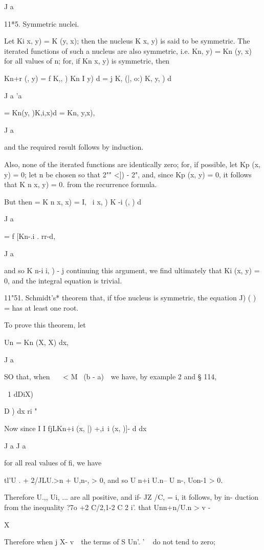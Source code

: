 {J a

%
%

11*5. Symmetric nuclei.

Let Ki x, y) = K (y, x); then the nucleus K x, y) is said to be
symmetric. The iterated functions of such a nucleus are also
symmetric, i.e. Kn, y) = Kn (y, x) for all values of n; for, if Kn
x, y) is symmetric, then

Kn+r (, y) = f K,, ) Kn I y) d = j K, (|, o:) K, y, ) d

J a 'a

= Kn(y, )K,i,x)d = Kn, y,x),

J a

and the required result follows by induction.

Also, none of the iterated functions are identically zero; for, if
possible, let Kp (x, y) = 0; let n be chosen so that 2"" <]) - 2",
and, since Kp (x, y) = 0, it follows that K n x, y) = 0. from the
recurrence formula.

But then = K n x, x) = I, \ i x, ) K -i (, ) d

J a

= f [Kn-.i . rr-d,

J a

and so K n-i i, ) - j continuing this argument, we find ultimately
that Ki (x, y) = 0, and the integral equation is trivial.

11"51. Schmidt's* theorem that, if tfoe nucleus is symmetric, the
equation J) ( ) = has at least one root.

To prove this theorem, let

Un = Kn (X, X) dx,

J a

SO that, when \ \ \ < M~ (b - a)~\ we have, by example 2 and §
114,

\ 1 dDiX)

D ) dx ri " 

Now since I I fjLKn+i (x, |) +,i\ i (x, )]- d dx

J a J a

for all real values of fi, we have

tl'U . + 2/JLU.>n + U,n-, > 0, and so U n+i U.n-- U n-, Uon-1 > 0.

Therefore U.,, Ui, ... are all positive, and if- JZ /C, = i, it
follows, by in- duction from the inequality ?7o +2 C/2,1-2 C 2 i'.
that Unn+n/U.n > v -

X

Therefore when j X- v~\ the terms of S Un'. ' ~ do not tend to zero;

}
